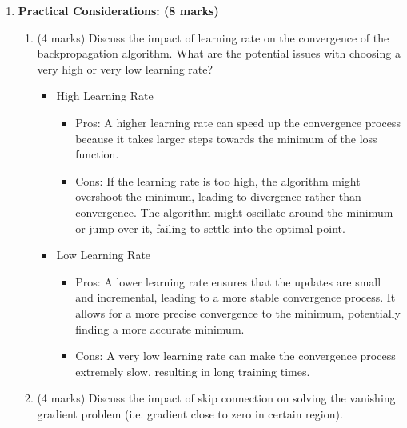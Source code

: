 \documentclass[12pt]{article}
\begin{document}
\begin{enumerate}[font=\Large]
	      \newpage
	\item \textbf{Practical Considerations: (8 marks)}
	      \begin{enumerate}[label=(\alph*)]
		      \item (4 marks) Discuss the impact of learning rate on the convergence of the backpropagation algorithm. What are the potential issues with choosing a very high or very low learning rate?
		            \begin{itemize}
			            \item High Learning Rate
			                  \begin{itemize}
				                  \item Pros: A higher learning rate can speed up the convergence process because it takes larger steps towards the minimum of the loss function.
				                  \item Cons: If the learning rate is too high, the algorithm might overshoot the minimum, leading to divergence rather than convergence. The algorithm might oscillate around the minimum or jump over it, failing to settle into the optimal point.
			                  \end{itemize}
			            \item Low Learning Rate
			                  \begin{itemize}
				                  \item Pros: A lower learning rate ensures that the updates are small and incremental, leading to a more stable convergence process. It allows for a more precise convergence to the minimum, potentially finding a more accurate minimum.
				                  \item Cons: A very low learning rate can make the convergence process extremely slow, resulting in long training times.
			                  \end{itemize}
		            \end{itemize}

		      \item (4 marks) Discuss the impact of skip connection on solving the vanishing gradient problem (i.e. gradient close to zero in certain region).


\end{enumerate}
\end{enumerate}
\end{document}
